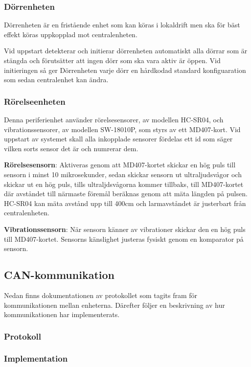 \documentclass{article}
\begin{document}
\subsubsection{Dörrenheten}
Dörrenheten är en fristående enhet som kan köras i lokaldrift
men ska för bäst effekt köras uppkopplad mot centralenheten.

Vid uppstart detekterar och initierar dörrenheten automatiskt alla dörrar som
är stängda och förutsätter att ingen dörr som ska vara aktiv är
öppen. Vid initieringen så ger Dörrenheten varje dörr en hårdkodad
standard konfiguaration som sedan centralenhet kan ändra. 
\subsubsection{Rörelseenheten}
Denna periferienhet använder rörelsesensorer, av modellen HC-SR04, och vibrationssensorer, av modellen SW-18010P, som styrs av ett MD407-kort. 
Vid uppstart av systemet skall alla inkopplade sensorer fördelas ett id som säger vilken sorts sensor det är och numrerar dem.

\textbf{Rörelsesensorn}: Aktiveras genom att MD407-kortet skickar en hög puls till sensorn i minst 10 mikrosekunder, sedan skickar sensorn ut ultraljudsvågor och skickar ut en hög puls, tills ultraljdsvågorna kommer tillbaks,  till MD407-kortet där avståndet till närmaste föremål beräknas genom att mäta längden på pulsen. HC-SR04 kan mäta avstånd upp till 400cm och larmavståndet är justerbart från centralenheten.

\textbf{Vibrationssensorn}: När sensorn känner av vibrationer skickar den en hög puls till MD407-kortet. Sensorns känslighet justeras fysiskt genom en komparator på sensorn.

\subsection{CAN-kommunikation}
\label{can}
Nedan finns dokumentationen av protokollet som tagits fram för 
kommunikationen mellan enheterna. Därefter följer en beskrivning 
av hur kommunikationen har implementerats.
\subsubsection{Protokoll}

\subsubsection{Implementation}
\end{document}
